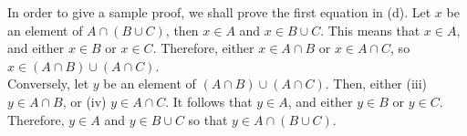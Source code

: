 In order to give a sample proof, we shall prove the first equation in (d).
Let $x$ be an element of $A\cap (B\cup C)$, then $x\in A$ and $x\in
B\cup C$.  This means that $x\in A$, and either $x\in B$ or $x\in C$.
Therefore, either $x\in A\cap B$ or $x\in A\cap C$, so $x\in
(A\cap B) \cup (A\cap C)$.\\

Conversely, let $y$ be an element of $(A\cap B)\cup (A\cap C)$. Then,
either (iii) $y\in A\cap B$, or (iv) $y\in A\cap C$.  It follows that
$y\in A$, and either $y\in B$ or $y\in C$. Therefore, $y\in A$ and $y\in
B\cup C$ so that $y\in A \cap (B\cup C)$.
